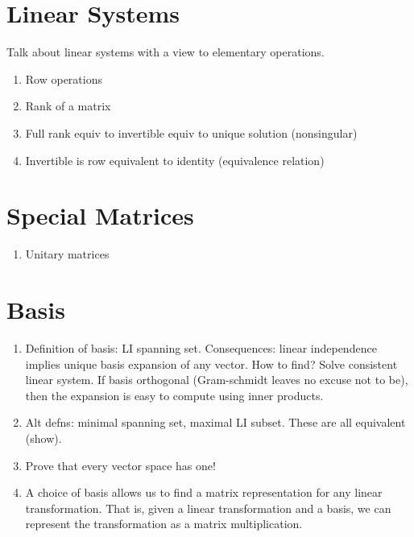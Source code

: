 


  



\tableofcontents


\chapter{Linear Systems}
Talk about linear systems with a view to elementary operations.
\begin{enumerate}
	\item Row operations
	\item Rank of a matrix
	\item Full rank equiv to invertible equiv to unique solution (nonsingular)
	\item Invertible is row equivalent to identity (equivalence relation)
\end{enumerate}


\chapter{Special Matrices}
\begin{enumerate}
	\item Unitary matrices
\end{enumerate}





\chapter{Basis}

\begin{enumerate}
	\item Definition of basis: LI spanning set. Consequences: linear independence implies unique basis expansion of any vector. How to find? Solve consistent linear system. If basis orthogonal (Gram-schmidt leaves no excuse not to be), then the expansion is easy to compute using inner products. 
	\item Alt defns: minimal spanning set, maximal LI subset. These are all equivalent (show).	
	\item Prove that every vector space has one!
	\item A choice of basis allows us to find a matrix representation for any linear transformation. That is, given a linear transformation and a basis, we can represent the transformation as a matrix multiplication.
\end{enumerate}


